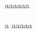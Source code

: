 \documentclass[preview]{standalone}
\begin{document}
\begin{center}
aaaaaa
        
 a aaaaa
\end{center}
\end{document}
